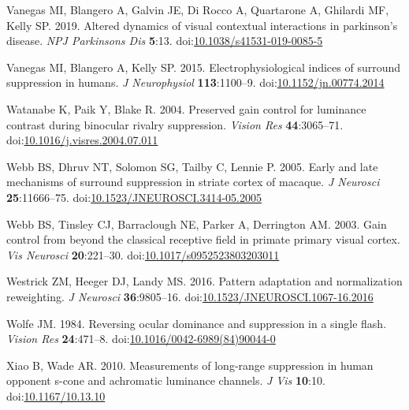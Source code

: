 \documentclass[]{article}
\begin{document}
\leavevmode\hypertarget{ref-Vanegas2019}{}%
Vanegas MI, Blangero A, Galvin JE, Di Rocco A, Quartarone A, Ghilardi MF, Kelly SP. 2019. Altered dynamics of visual contextual interactions in parkinson's disease. \emph{NPJ Parkinsons Dis} \textbf{5}:13. doi:\href{https://doi.org/10.1038/s41531-019-0085-5}{10.1038/s41531-019-0085-5}

\leavevmode\hypertarget{ref-Vanegas2015}{}%
Vanegas MI, Blangero A, Kelly SP. 2015. Electrophysiological indices of surround suppression in humans. \emph{J Neurophysiol} \textbf{113}:1100--9. doi:\href{https://doi.org/10.1152/jn.00774.2014}{10.1152/jn.00774.2014}

\leavevmode\hypertarget{ref-Watanabe2004}{}%
Watanabe K, Paik Y, Blake R. 2004. Preserved gain control for luminance contrast during binocular rivalry suppression. \emph{Vision Res} \textbf{44}:3065--71. doi:\href{https://doi.org/10.1016/j.visres.2004.07.011}{10.1016/j.visres.2004.07.011}

\leavevmode\hypertarget{ref-Webb2005}{}%
Webb BS, Dhruv NT, Solomon SG, Tailby C, Lennie P. 2005. Early and late mechanisms of surround suppression in striate cortex of macaque. \emph{J Neurosci} \textbf{25}:11666--75. doi:\href{https://doi.org/10.1523/JNEUROSCI.3414-05.2005}{10.1523/JNEUROSCI.3414-05.2005}

\leavevmode\hypertarget{ref-Webb2003}{}%
Webb BS, Tinsley CJ, Barraclough NE, Parker A, Derrington AM. 2003. Gain control from beyond the classical receptive field in primate primary visual cortex. \emph{Vis Neurosci} \textbf{20}:221--30. doi:\href{https://doi.org/10.1017/s0952523803203011}{10.1017/s0952523803203011}

\leavevmode\hypertarget{ref-Westrick2016}{}%
Westrick ZM, Heeger DJ, Landy MS. 2016. Pattern adaptation and normalization reweighting. \emph{J Neurosci} \textbf{36}:9805--16. doi:\href{https://doi.org/10.1523/JNEUROSCI.1067-16.2016}{10.1523/JNEUROSCI.1067-16.2016}

\leavevmode\hypertarget{ref-Wolfe1984}{}%
Wolfe JM. 1984. Reversing ocular dominance and suppression in a single flash. \emph{Vision Res} \textbf{24}:471--8. doi:\href{https://doi.org/10.1016/0042-6989(84)90044-0}{10.1016/0042-6989(84)90044-0}

\leavevmode\hypertarget{ref-Xiao2010}{}%
Xiao B, Wade AR. 2010. Measurements of long-range suppression in human opponent s-cone and achromatic luminance channels. \emph{J Vis} \textbf{10}:10. doi:\href{https://doi.org/10.1167/10.13.10}{10.1167/10.13.10}
\end{document}
